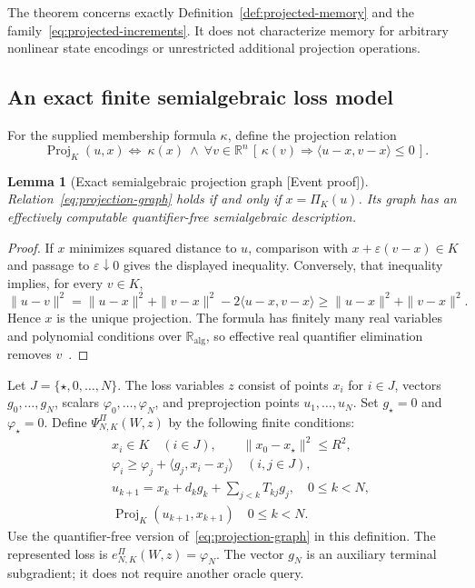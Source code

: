 \documentclass[11pt]{article}
\newcommand{\supportlabel}[1]{\textcolor{blue!60!black}{\small\textsf{[#1]}}}
\newcommand{\eventproof}{\supportlabel{Event proof}}
\numberwithin{equation}{section}
\newtheorem{lemma}[theorem]{Lemma}
\theoremstyle{definition}
\newcommand{\R}{\mathbb R}
\newcommand{\K}{\mathbb R_{\mathrm{alg}}}
\begin{document}
The theorem concerns exactly Definition~\ref{def:projected-memory} and the family~\eqref{eq:projected-increments}. It does not characterize memory for arbitrary nonlinear state encodings or unrestricted additional projection operations.

\subsection{An exact finite semialgebraic loss model}
For the supplied membership formula $\kappa$, define the projection relation
\begin{equation}
 \operatorname{Proj}_K(u,x) \Longleftrightarrow\
 \kappa(x)\ \land\
 \forall v\in\R^n\,
 [\,\kappa(v)\Rightarrow\langle u-x,v-x\rangle\le0\,].
 \label{eq:projection-graph}
\end{equation}
\begin{lemma}[Exact semialgebraic projection graph \eventproof]\label{lem:projection-graph}
Relation~\eqref{eq:projection-graph} holds if and only if $x=\Pi_K(u)$. Its graph has an effectively computable quantifier-free semialgebraic description.
\end{lemma}
\begin{proof}
If $x$ minimizes squared distance to $u$, comparison with $x+\varepsilon(v-x)\in K$ and passage to $\varepsilon\downarrow0$ gives the displayed inequality. Conversely, that inequality implies, for every $v\in K$,
\[
 \|u-v\|^2
 =\|u-x\|^2+\|v-x\|^2-2\langle u-x,v-x\rangle
 \ge\|u-x\|^2+\|v-x\|^2.
\]
Hence $x$ is the unique projection. The formula has finitely many real variables and polynomial conditions over $\K$, so effective real quantifier elimination removes $v$~\cite{BPR}.
\end{proof}

Let $J=\{\star,0,\ldots,N\}$. The loss variables $z$ consist of points $x_i$ for $i\in J$, vectors $g_0,\ldots,g_N$, scalars $\varphi_0,\ldots,\varphi_N$, and preprojection points $u_1,\ldots,u_N$. Set $g_\star=0$ and $\varphi_\star=0$. Define $\Psi_{N,K}^\Pi(W,z)$ by the following finite conditions:
\begin{align}
 &x_i\in K\quad(i\in J),\qquad
   \|x_0-x_\star\|^2\le R^2,\label{eq:projected-loss-model}\\
 &\varphi_i\ge\varphi_j+\langle g_j,x_i-x_j\rangle
                      \quad(i,j\in J),\nonumber\\
 &u_{k+1}=x_k+d_kg_k+\sum_{j<k}T_{kj}g_j,
                         \quad 0\le k<N,\nonumber\\
 &\operatorname{Proj}_K(u_{k+1},x_{k+1})
                         \quad 0\le k<N.\nonumber
\end{align}
Use the quantifier-free version of~\eqref{eq:projection-graph} in this definition. The represented loss is $e_{N,K}^\Pi(W,z)=\varphi_N$. The vector $g_N$ is an auxiliary terminal subgradient; it does not require another oracle query.
\end{document}
